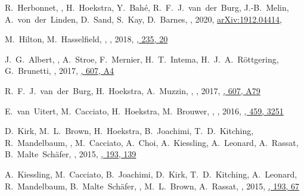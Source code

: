 
\item
R.~Herbonnet, \myself, H.~Hoekstra, Y.~Bah\'e, R.~F.~J.~van~der~Burg, J.-B.~Melin, A.~von~der~Linden, D.~Sand, S.~Kay, D.~Barnes,
,
2020, \href{https://ui.adsabs.harvard.edu/abs/2020MNRAS.tmp.2325H/abstract}{arXiv:1912.04414},
\accepted{\mnras}

\item
M.~Hilton, M.~Hasselfield, \myself, 
,
2018, \href{http://ui.adsabs.harvard.edu/abs/2018ApJS..235...20H}{\apjs, 235, 20}

\item
J.~G.~Albert, \myself, A.~Stroe, F.~Mernier, H.~T.~Intema, H.~J.~A.~R\"ottgering, 
G.~Brunetti,
,
2017, \href{http://adsabs.harvard.edu/abs/2017A&A...607A...4A}{\aap, 607, A4}

\item
R.~F.~J.~van~der~Burg, H.~Hoekstra, A.~Muzzin, \myself, 
,
2017, \href{http://adsabs.harvard.edu/abs/2017A&A...607A..79V}{\aap, 607, A79}

\item
E.~van~Uitert, M.~Cacciato, H.~Hoekstra, M.~Brouwer, \myself, 
,
2016, \href{http://adsabs.harvard.edu/abs/2016MNRAS.459.3251V}{\mnras, 459, 3251}

\item
D.~Kirk, M.~L.~Brown, H.~Hoekstra, B.~Joachimi, T.~D.~Kitching, R.~Mandelbaum, \myself, 
M.~Cacciato, A.~Choi, A.~Kiessling, A.~Leonard, A.~Rassat, B.~Malte~Sch\"afer,
,
2015, \href{http://adsabs.harvard.edu/doi/10.1007/s11214-015-0213-4}{\ssr, 193, 139}

\item
A.~Kiessling, M.~Cacciato, B.~Joachimi, D.~Kirk, T.~D.~Kitching, A.~Leonard, R.~Mandelbaum, B.~Malte~Sch\"afer, \myself, M.~L.~Brown, A.~Rassat,
,
2015, \href{http://adsabs.harvard.edu/doi/10.1007/s11214-015-0203-6}{\ssr, 193, 67}

